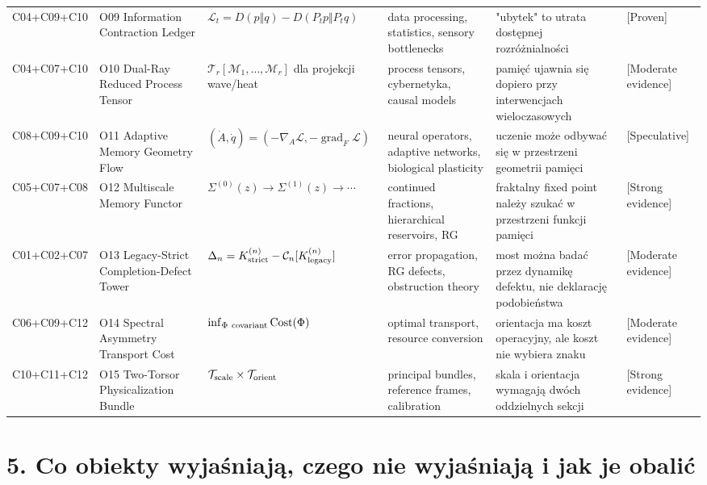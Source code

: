 \documentclass[11pt,a4paper,openany]{report}
\newcommand{\statusProven}{\textcolor{fingreen}{[Proven]}}
\newcommand{\statusStrong}{\textcolor{finblue}{[Strong evidence]}}
\newcommand{\statusModerate}{\textcolor{finviolet}{[Moderate evidence]}}
\newcommand{\statusSpeculative}{\textcolor{finorange}{[Speculative]}}
\begin{document}
\begin{center}
\begin{longtable}{@{}p{}p{}p{}p{}p{}p{}@{}}
C04+\allowbreak{}C09+\allowbreak{}C10 & O09 Information Contraction Ledger & \(\mathcal L_t=D(p\Vert q)-D(P_tp\Vert P_tq)\) & data processing, statistics, sensory bottlenecks & "ubytek" to utrata dostępnej rozró\.znialności & \statusProven{} \\
C04+\allowbreak{}C07+\allowbreak{}C10 & O10 Dual-Ray Reduced Process Tensor & \(\mathcal T_r[\mathcal M_1,\ldots,\mathcal M_r]\) dla projekcji wave/\allowbreak{}heat & process tensors, cybernetyka, causal models & pamięć ujawnia się dopiero przy interwencjach wieloczasowych & \statusModerate{} \\
C08+\allowbreak{}C09+\allowbreak{}C10 & O11 Adaptive Memory Geometry Flow & \((\dot A,\dot q)=(-\nabla_A\mathcal L,-\operatorname{grad}_F\mathcal L)\) & neural operators, adaptive networks, biological plasticity & uczenie mo\.ze odbywać się w przestrzeni geometrii pamięci & \statusSpeculative{} \\
C05+\allowbreak{}C07+\allowbreak{}C08 & O12 Multiscale Memory Functor & \(\Sigma^{(0)}(z)\to\Sigma^{(1)}(z)\to\cdots\) & continued fractions, hierarchical reservoirs, RG & fraktalny fixed point nale\.zy szukać w przestrzeni funkcji pamięci & \statusStrong{} \\
C01+\allowbreak{}C02+\allowbreak{}C07 & O13 Legacy-Strict Completion-Defect Tower & \(\Delta_n=K_{\rm strict}^{(n)}-\mathcal C_n[K_{\rm legacy}^{(n)}]\) & error propagation, RG defects, obstruction theory & most mo\.zna badać przez dynamikę defektu, nie deklarację podobieństwa & \statusModerate{} \\
C06+\allowbreak{}C09+\allowbreak{}C12 & O14 Spectral Asymmetry Transport Cost & \(\inf_{\Phi\ {\rm covariant}}\operatorname{Cost}(\Phi)\) & optimal transport, resource conversion & orientacja ma koszt operacyjny, ale koszt nie wybiera znaku & \statusModerate{} \\
C10+\allowbreak{}C11+\allowbreak{}C12 & O15 Two-Torsor Physicalization Bundle & \(\mathcal T_{\rm scale}\times\mathcal T_{\rm orient}\) & principal bundles, reference frames, calibration & skala i orientacja wymagają dwóch oddzielnych sekcji & \statusStrong{} \\
\bottomrule
\end{longtable}
\endgroup
\end{center}

\chapter{5. Co obiekty wyjaśniają, czego nie wyjaśniają i jak je obalić}
\end{document}

